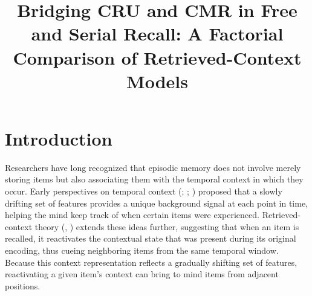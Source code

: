 \documentclass[
  man,
  floatsintext,
  longtable,
  nolmodern,
  notxfonts,
  notimes,
  draftfirst,
  colorlinks=true,linkcolor=blue,citecolor=blue,urlcolor=blue]{apa7}
\title{Bridging CRU and CMR in Free and Serial Recall: A Factorial
Comparison of Retrieved-Context Models}
\affiliation{
{Department of Psychology, Vanderbilt University}}
\begin{document}
\maketitle


\setcounter{secnumdepth}{-\maxdimen} %

\setlength\LTleft{0pt}


\section{Introduction}\label{introduction}

Researchers have long recognized that episodic memory does not involve
merely storing items but also associating them with the temporal context
in which they occur. Early perspectives on temporal context
(;
;
) proposed
that a slowly drifting set of features provides a unique background
signal at each point in time, helping the mind keep track of when
certain items were experienced. Retrieved-context theory
(,
) extends these ideas further,
suggesting that when an item is recalled, it reactivates the contextual
state that was present during its original encoding, thus cueing
neighboring items from the same temporal window. Because this context
representation reflects a gradually shifting set of features,
reactivating a given item's context can bring to mind items from
adjacent positions.
\end{document}
